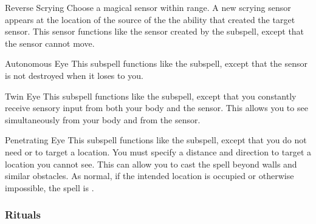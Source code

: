 \begin{ability}[\nth{2}]{Reverse Scrying}
Choose a magical sensor within \rngmed range.
A new scrying sensor appears at the location of the source of the the ability that created the target sensor.
This sensor functions like the sensor created by the  subspell, except that the sensor cannot move.
\end{ability}
\vspace{0.25em}



\begin{ability}[\nth{3}]{Autonomous Eye}
This subspell functions like the  subspell, except that the sensor is not destroyed when it loses  to you.
\end{ability}
\vspace{0.25em}



\begin{ability}[\nth{3}]{Twin Eye}
This subspell functions like the  subspell, except that you constantly receive sensory input from both your body and the sensor.
This allows you to see simultaneously from your body and from the sensor.
\end{ability}
\vspace{0.25em}



\begin{ability}[\nth{4}]{Penetrating Eye}
This subspell functions like the  subspell, except that you do not need  or  to target a location.
You must specify a distance and direction to target a location you cannot see.
This can allow you to cast the spell beyond walls and similar obstacles.
As normal, if the intended location is occupied or otherwise impossible, the spell is .
\end{ability}
\vspace{0.25em}



\subsubsection{Rituals}


